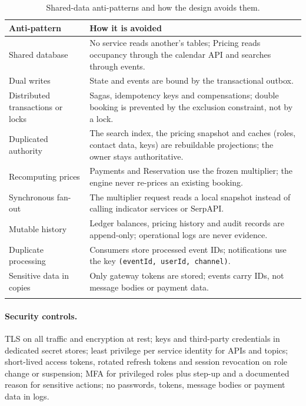 \begin{longtable}{@{}L{3.6cm}L{10.2cm}@{}}
\toprule
\textbf{Anti-pattern} & \textbf{How it is avoided} \\
\midrule
\endhead
Shared database & No service reads another's tables; Pricing reads occupancy
  through the calendar API and searches through events. \\
Dual writes & State and events are bound by the transactional outbox. \\
Distributed transactions or locks & Sagas, idempotency keys and
  compensations; double booking is prevented by the exclusion constraint, not
  by a lock. \\
Duplicated authority & The search index, the pricing snapshot and caches
  (roles, contact data, keys) are rebuildable projections; the owner stays
  authoritative. \\
Recomputing prices & Payments and Reservation use the frozen multiplier; the
  engine never re-prices an existing booking. \\
Synchronous fan-out & The multiplier request reads a local snapshot instead
  of calling indicator services or SerpAPI. \\
Mutable history & Ledger balances, pricing history and audit records are
  append-only; operational logs are never evidence. \\
Duplicate processing & Consumers store processed event IDs; notifications use
  the key \texttt{(eventId, userId, channel)}. \\
Sensitive data in copies & Only gateway tokens are stored; events carry IDs,
  not message bodies or payment data. \\
\bottomrule
\caption{Shared-data anti-patterns and how the design avoids them.}
\label{tab:antipatterns}
\end{longtable}

\paragraph{Security controls.} TLS on all traffic and encryption at rest;
keys and third-party credentials in dedicated secret stores; least privilege
per service identity for APIs and topics; short-lived access tokens, rotated
refresh tokens and session revocation on role change or suspension; MFA for
privileged roles plus step-up and a documented reason for sensitive actions;
no passwords, tokens, message bodies or payment data in logs.
